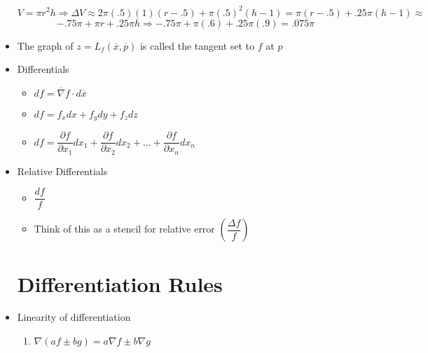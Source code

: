 \begin{itemize}
    $$V=\pi r^2h\Rightarrow \Delta V \approx 2\pi(.5)(1)(r - .5) + \pi(.5)^2(h - 1) = \pi(r - .5) + .25\pi(h - 1) \approx$$
    $$-.75\pi + \pi r + .25\pi h\Rightarrow -.75\pi + \pi(.6) + .25\pi(.9) = .075\pi$$

    \vspace{5pt}

  \item The graph of $z=L_f(\overline{x},\overline{p})$ is called the tangent set to $f$ at $p$

  \item Differentials

    \begin{itemize}

      \item $df = \overline{\nabla}f\cdot d\overline{x}$

      \item $df = f_xdx + f_ydy + f_zdz$

      \item $df = \dfrac{\partial f}{\partial x_1}dx_1 + \dfrac{\partial f}{\partial x_2}dx_2 + \dots + \dfrac{\partial f}{\partial x_n}dx_n$

    \end{itemize}

  \item Relative Differentials

    \begin{itemize}

      \item $\dfrac{df}{f}$

      \item Think of this as a stencil for relative error $\left( \dfrac{\Delta f}{f} \right)$

    \end{itemize}

    \section{Differentiation Rules}

  \item Linearity of differentiation

    \begin{enumerate}

      \item $\nabla(af\pm bg) = a\nabla f \pm b\nabla g$

    \end{enumerate}


\end{itemize}
